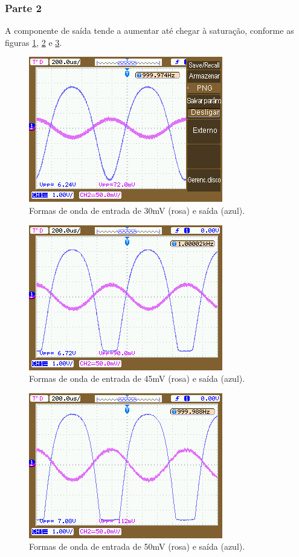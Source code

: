 \documentclass{abntex2}
\begin{document}
\subsubsection{Parte 2}

  A componente de saída tende a aumentar até chegar à saturação, conforme as figuras \ref{fig:saida2_1}, \ref{fig:saida2_2} e \ref{fig:saida2_3}.

  \begin{figure}[h]
    \centering
    \includegraphics[scale = 0.5]{saida2_1.png}
    \caption{Formas de onda de entrada de 30mV (rosa) e saída (azul).}
    \label{fig:saida2_1}
  \end{figure}
  \begin{figure}[h]
    \centering
    \includegraphics[scale = 0.5]{saida2_2.png}
    \caption{Formas de onda de entrada de 45mV (rosa) e saída (azul).}
    \label{fig:saida2_2}
  \end{figure}
  \begin{figure}[h]
    \centering
    \includegraphics[scale = 0.5]{saida2_3.png}
    \caption{Formas de onda de entrada de 50mV (rosa) e saída (azul).}
    \label{fig:saida2_3}
  \end{figure}
\end{document}
